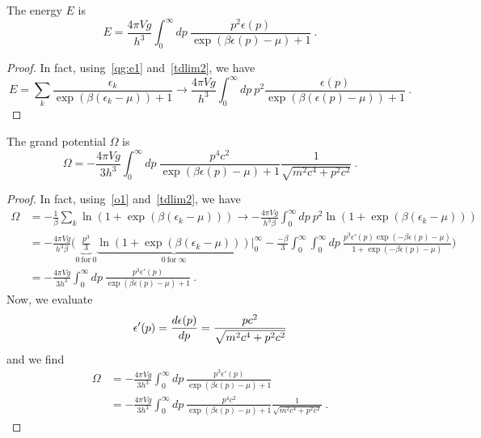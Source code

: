     The energy $E$ is 
    \begin{equation*}
        E = \frac{4 \pi V g}{h^3} \int_0^\infty dp ~ \frac{p^2 \epsilon(p)}{\exp(\beta \epsilon(p) - \mu) + 1} ~.
    \end{equation*}
    \begin{proof}
        In fact, using~\eqref{qg:e1} and~\eqref{tdlim2}, we have 
        \begin{equation}
            E = \sum_k \frac{\epsilon_k}{\exp(\beta(\epsilon_k - \mu)) + 1} \rightarrow \frac{4 \pi V g}{h^3} \int_0^\infty dp ~ p^2 \frac{\epsilon(p)}{\exp(\beta(\epsilon (p) - \mu)) + 1} ~.
        \end{equation}
    \end{proof}

    The grand potential $\Omega$ is 
    \begin{equation*}
        \Omega = - \frac{4 \pi V g}{3 h^3} \int_0^\infty dp ~ \frac{p^4 c^2}{\exp(\beta \epsilon(p) - \mu) + 1} \frac{1}{\sqrt{m^2 c^4 + p^2 c^2}} ~.
    \end{equation*}
    \begin{proof}
        In fact, using~\eqref{o1} and~\eqref{tdlim2}, we have 
        \begin{equation}
        \begin{aligned}
            \Omega & = - \frac{1}{\beta} \sum_k \ln (1 + \exp(\beta(\epsilon_k - \mu))) \rightarrow - \frac{4 \pi V g}{h^3 \beta} \int_0^\infty dp ~ p^2 \ln (1 + \exp(\beta(\epsilon_k - \mu))) \\ & = - \frac{4 \pi V g}{h^3 \beta} \Big ( \underbrace{ \frac{p^3}{3} }_{0 ~ \text{for} ~ 0} \underbrace{\ln (1 + \exp(\beta(\epsilon_k - \mu)))}_{0 ~ \text{for} ~ \infty}  \Big \vert_0^\infty - \frac{-\beta}{3} \int_0^\infty \int_0^\infty dp ~ \frac{p^3 \epsilon'(p) \exp(- \beta \epsilon(p) - \mu)}{1 + \exp(- \beta \epsilon(p) - \mu)} \Big ) \\ & = - \frac{4 \pi V g}{3 h^3} \int_0^\infty dp ~ \frac{p^3 \epsilon'(p)}{\exp(\beta \epsilon(p) - \mu) + 1} ~.
        \end{aligned}
        \end{equation}
        Now, we evaluate 
        \begin{equation}
            \epsilon'(p) = \frac{d\epsilon(p)}{dp} = \frac{p c^2}{\sqrt{m^2 c^4 + p^2 c^2}}
        \end{equation}
        and we find 
        \begin{equation*}
        \begin{aligned}
            \Omega & = - \frac{4 \pi V g}{3 h^3} \int_0^\infty dp ~ \frac{p^3 \epsilon'(p)}{\exp(\beta \epsilon(p) - \mu) + 1} \\ & = - \frac{4 \pi V g}{3 h^3} \int_0^\infty dp ~ \frac{p^4 c^2}{\exp(\beta \epsilon(p) - \mu) + 1} \frac{1}{\sqrt{m^2 c^4 + p^2 c^2}} ~.
        \end{aligned}
        \end{equation*}
    \end{proof}

